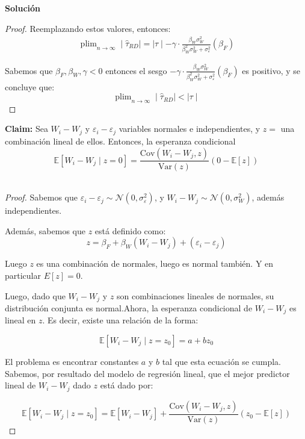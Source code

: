 \documentclass[a4paper, answers, addpoints, 11pt]{exam}
\DeclareMathOperator*{\plim}{plim}
\newenvironment{solucion}{%
  \begin{mdframed}[
    backgroundcolor=blue!5,    %
    linecolor=blue!50,          %
    linewidth=2pt,              %
    leftmargin=10pt,            %
    rightmargin=8pt,           %
    topline=true,              %
    bottomline=true,            %
    roundcorner=10pt,           %
    innerleftmargin=10pt,       %
    innerrightmargin=10pt,      %
    innerbottommargin=10pt,     %
    innertopmargin=10pt         %
  ]%
  \begin{tcolorbox}[colframe=blue!50!black, colback=blue!50, coltitle=white, sharp corners=all, boxrule=1mm, width=\textwidth, halign=left, valign=center, top=0mm, bottom=0mm, left=0mm, right=0mm] \textbf{Solución} \end{tcolorbox} }{\end{mdframed}}
\begin{document}
\begin{enumerate}[resume]
\begin{enumerate}
\begin{solucion}
\begin{proof}
Reemplazando estos valores, entonces:
\begin{align*}
\plim_{n \to \infty} \mid\hat{\tau}_{RD}\mid  = \mid\tau \mid-\gamma \cdot \frac{\beta_W \sigma_W^2}{\beta_W^2 \sigma_W^2 + \sigma_\varepsilon^2} (\beta_F)
\end{align*}

Sabemos que $\beta_F,  \beta_W ,\gamma< 0$ entonces el sesgo $- \gamma \cdot \frac{\beta_W \sigma_W^2}{\beta_W^2 \sigma_W^2 + \sigma_\varepsilon^2} (\beta_F)$ es positivo, y se concluye que:
\[
\plim_{n \to \infty} \mid\hat{\tau}_{RD}\mid < \mid\tau\mid
\]
\end{proof}



 \begin{mdframed}[backgroundcolor=moraditoClaro]
\hypertarget{claimesperanzacondicional}{}
      \textbf{Claim:} Sea  \( W_i - W_j \) y \( \varepsilon_i - \varepsilon_j \)  variables normales e independientes, y \( z = \) una combinación lineal de ellos. Entonces, la esperanza condicional $$\mathbb{E}[W_i - W_j \mid z = 0] = \frac{\text{Cov}(W_i - W_j, z)}{\text{Var}(z)} (0 - \mathbb{E}[z])$$\\
    
      \begin{proof}
    Sabemos que \( \varepsilon_i - \varepsilon_j \sim \mathcal{N}(0, \sigma_\varepsilon^2) \), y \(  W_i - W_j \sim \mathcal{N}(0, \sigma_W^2) \), además independientes.

Además, sabemos que \( z \) está definido como:
\[
z = \beta_F + \beta_W(W_i - W_j) + (\varepsilon_i - \varepsilon_j)
\]

Luego $z$ es una combinación de normales, luego es normal también. Y en particular $E[z]=0$.

Luego, dado que \(  W_i - W_j \) y \( z \) son combinaciones lineales de normales, su distribución conjunta es normal.Ahora, la esperanza condicional de $W_i - W_j$ es lineal en \( z \). Es decir, existe una relación de la forma:

\[
\mathbb{E}[W_i - W_j  \mid z = z_0] = a + b z_0
\]

El problema es encontrar constantes \( a \) y \( b \) tal que esta ecuación se cumpla. Sabemos, por resultado del modelo de regresión lineal, que el mejor predictor lineal de \( W_i - W_j  \) dado \( z \) está dado por:

\[
\mathbb{E}[W_i - W_j  \mid z = z_0] = \mathbb{E}[W_i - W_j]  + \frac{\text{Cov}(W_i - W_j, z)}{\text{Var}(z)} (z_0 - \mathbb{E}[z] )
\]


\end{proof}
\end{mdframed}
\end{solucion}
\end{enumerate}
\end{enumerate}
\end{document}
